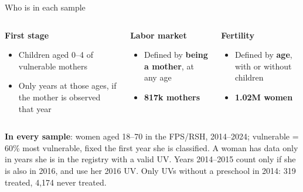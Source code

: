 \documentclass[aspectratio=169,10pt]{beamer}
\newcommand{\takeaway}[1]{\par\vspace{6pt}{\small\textcolor{steel}{$\Rightarrow$}\ \textbf{\textcolor{navy}{#1}}}}
\begin{document}
\begin{frame}{Who is in each sample}
\begin{columns}[T]
\begin{column}{0.31\textwidth}
{\small\textcolor{steel}{\textbf{First stage}}}
\begin{itemize}
  \footnotesize
  \item Children aged 0--4 of vulnerable mothers
  \item Only years at those ages, if the mother is observed that year
\end{itemize}
\end{column}
\begin{column}{0.33\textwidth}
{\small\textcolor{steel}{\textbf{Labor market}}}
\begin{itemize}
  \footnotesize
  \item Defined by \textbf{being a mother}, at any age
  \item \textbf{817k mothers}
\end{itemize}
\end{column}
\begin{column}{0.33\textwidth}
{\small\textcolor{steel}{\textbf{Fertility}}}
\begin{itemize}
  \footnotesize
  \item Defined by \textbf{age}, with or without children
  \item \textbf{1.02M women}
\end{itemize}
\end{column}
\end{columns}

\vspace{6pt}
\colorbox{bgpanel}{\parbox{0.97\linewidth}{\raggedright\footnotesize
\textbf{In every sample}: women aged 18--70 in the FPS/RSH, 2014--2024; vulnerable = 60\% most vulnerable, fixed the first year she is classified. A woman has data only in years she is in the registry with a valid UV. Years 2014--2015 count only if she is also in 2016, and use her 2016 UV. Only UVs without a preschool in 2014: 319 treated, 4,174 never treated.}}
\takeaway{The labor sample follows mothers; the fertility sample follows women of a fixed age group.}
\end{frame}
\end{document}
